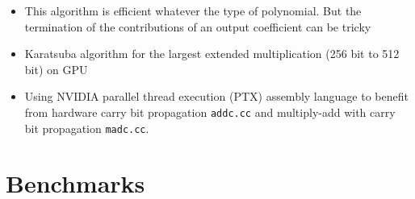 \documentclass[oribibl]{llncs2e/llncs}
\begin{document}
\begin{itemize}
\item {\color{blue} This algorithm is efficient whatever the type of polynomial. But the termination of the contributions of an output coefficient can be tricky}
\item {\color{blue}  Karatsuba algorithm \cite{Karatsuba1963} for the largest extended multiplication (256 bit to 512 bit) on GPU}
\item Using NVIDIA parallel thread execution (PTX) assembly language to benefit from hardware carry bit propagation \verb|addc.cc| and multiply-add with carry bit propagation \verb|madc.cc|.
\end{itemize}

\section{Benchmarks}
\end{document}
